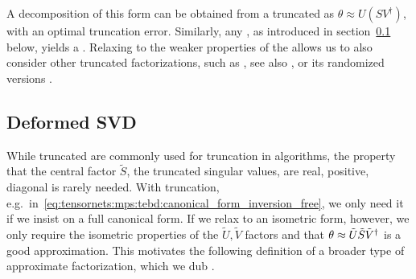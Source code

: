 A decomposition of this form can be obtained from a truncated  as $\theta \approx U (S V^\dagger)$, with an optimal truncation error.
%
Similarly, any , as introduced in section~\ref{subsec:truncation:factorizations:deformed_svd} below, yields a .
%
Relaxing to the weaker properties of the  allows us to also consider other truncated factorizations, such as  \cite{businger1965, chan1987}, see also \cite[§5.4]{golub2013}, or its randomized versions \cite{duersch2017, xiao2017, melnichenko2024}.
%

\subsection{Deformed SVD}
\label{subsec:truncation:factorizations:deformed_svd}
While truncated  are commonly used for truncation in  algorithms, the property that the central factor $\tilde{S}$, the truncated singular values, are real, positive, diagonal is rarely needed.
%
With  truncation, e.g.~in~\eqref{eq:tensornets:mps:tebd:canonical_form_inversion_free}, we only need it if we insist on a full canonical form.
%
If we relax to an isometric form, however, we only require the isometric properties of the $\tilde{U}, \tilde{V}$ factors and that $\theta \approx \tilde{U} \tilde{S} \tilde{V}^\dagger$ is a good approximation.
%
This motivates the following definition of a broader type of approximate factorization, which we dub .


